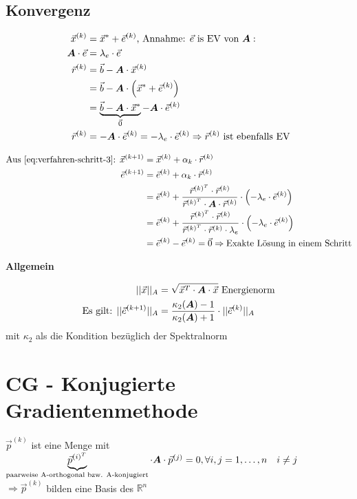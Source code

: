\subsection{Konvergenz}
\begin{align}
	\vec{x}^{(k)} &= \vec{x}^* + \vec{e}^{(k)} \text{, Annahme: } \vec{e} \text{ is EV von } \boldsymbol {A}:\\
	\boldsymbol {A} \cdot \vec{e} &= \lambda_e \cdot \vec{e}\\
	\vec{r}^{(k)} &= \vec{b} - \boldsymbol {A} \cdot \vec{x}^{(k)}\\
	&= \vec{b} - \boldsymbol {A} \cdot \left( \vec{x}^* + \vec{e}^{(k)}\right)\\
	&= \underbrace{\vec{b} - \boldsymbol {A} \cdot \vec{x}^*}_{\vec{0}} - \boldsymbol {A} \cdot \vec{e}^{(k)}\\
	\vec{r}^{(k)} &= - \boldsymbol {A} \cdot \vec{e}^{(k)} = - \lambda_e \cdot \vec{e}^{(k)} \Rightarrow \vec{r}^{(k)} \text{ ist ebenfalls EV}
\end{align}

\begin{align}
	\text{Aus \autoref{eq:verfahren-schritt-3}: } \vec{x}^{(k+1)} &= \vec{x}^{(k)} + \alpha_k \cdot \vec{r}^{(k)}\\
	\vec{e}^{(k+1)} &= \vec{e}^{(k)} + \alpha_k \cdot \vec{r}^{(k)}\\
	&= \vec{e}^{(k)} + \frac{\vec{r}^{{(k)}^T} \cdot \vec{r}^{(k)}}{\vec{r}^{{(k)}^T} \cdot \ma{A} \cdot \vec{r}^{(k)}} \cdot \left( -\lambda_e \cdot \vec{e}^{(k)}\right)\\
	&= \vec{e}^{(k)} + \frac{\vec{r}^{{(k)}^T} \cdot \vec{r}^{(k)}}{\vec{r}^{{(k)}^T} \cdot \vec{r}^{(k)} \cdot \lambda_e} \cdot \left( -\lambda_e \cdot \vec{e}^{(k)}\right)\\
	&= \vec{e}^{(k)} - \vec{e}^{(k)} = \vec{0} \Rightarrow \text{Exakte Lösung in einem Schritt}
\end{align}

\textbf{Allgemein}

\begin{align}
||\vec{x}||_A &= \sqrt{\vec{x}^T \cdot \boldsymbol {A} \cdot \vec{x}} \text{ Energienorm}\\
\text{Es gilt: } ||\vec{e}^{(k+1)}||_A &= \frac{\kappa_2(\boldsymbol {A})-1}{\kappa_2(\boldsymbol {A})+1} \cdot ||\vec{e}^{(k)}||_A
\end{align}
mit $\kappa_2$ als die Kondition bezüglich der Spektralnorm

\section{CG - Konjugierte Gradientenmethode}
$ \vec{p}^{(k)} $ ist eine Menge mit $ \underbrace{\vec{p}^{{(i)}^T}}_{\text{paarweise A-orthogonal bzw. A-konjugiert}} \cdot \boldsymbol {A} \cdot \vec{p}^{(j)} = 0, \forall i,j=1,\ldots,n\quad i \neq j$\\
$ \Rightarrow \vec{p}^{(k)}$ bilden eine Basis des $\mathbb{R}^n$

